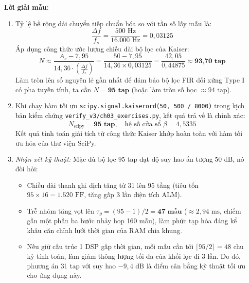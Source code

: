 \textbf{Lời giải mẫu:}
\begin{enumerate}[label=(\alph*)]
    \item Tỷ lệ bề rộng dải chuyển tiếp chuẩn hóa so với tần số lấy mẫu là:
    \begin{equation}
    \frac{\Delta f}{f_s} = \frac{500\text{ Hz}}{16.000\text{ Hz}} = 0{,}03125
    \end{equation}
    Áp dụng công thức ước lượng chiều dài bộ lọc của Kaiser:
    \begin{equation}
    N \approx \frac{A_s - 7{,}95}{14{,}36 \cdot \left(\frac{\Delta f}{f_s}\right)} = \frac{50 - 7{,}95}{14{,}36 \times 0{,}03125} = \frac{42{,}05}{0{,}44875} \approx \textbf{93{,}70 tap}
    \end{equation}
    Làm tròn lên số nguyên lẻ gần nhất để đảm bảo bộ lọc FIR đối xứng Type I có pha tuyến tính, ta cần $N = \textbf{95 tap}$ (hoặc làm tròn số học $\approx 94\text{ tap}$).
    \item Khi chạy hàm tối ưu \texttt{scipy.signal.kaiserord(50, 500 / 8000)} trong kịch bản kiểm chứng \texttt{verify\_v3/ch03\_exercises.py}, kết quả trả về là chính xác:
    \begin{equation}
    N_{\text{scipy}} = \textbf{95 tap}, \quad \text{hệ số cửa sổ } \beta = 4{,}5335
    \end{equation}
    Kết quả tính toán giải tích từ công thức Kaiser khớp hoàn toàn với hàm tối ưu hóa của thư viện SciPy.
    \item \emph{Nhận xét kỹ thuật:} Mặc dù bộ lọc 95 tap đạt độ suy hao ấn tượng $50\text{ dB}$, nó đòi hỏi:
    \begin{itemize}
        \item Chiều dài thanh ghi dịch tăng từ 31 lên 95 tầng (tiêu tốn $95 \times 16 = 1.520\text{ FF}$, tăng gấp 3 lần diện tích ALM).
        \item Trễ nhóm tăng vọt lên $\tau_g = (95 - 1) / 2 = \textbf{47 mẫu}$ ($\approx 2{,}94\text{ ms}$, chiếm gần một phần ba bước nhảy hop 160 mẫu), làm phức tạp hóa đáng kể khâu căn chỉnh lưới thời gian của RAM chia khung.
        \item Nếu giữ cấu trúc 1 DSP gấp thời gian, mỗi mẫu cần tới $\lceil 95/2 \rceil = 48$ chu kỳ tính toán, làm giảm thông lượng tối đa của khối lọc đi 3 lần. Do đó, phương án 31 tap với suy hao $-9{,}4\text{ dB}$ là điểm cân bằng kỹ thuật tối ưu cho ứng dụng này.
    \end{itemize}
\end{enumerate}

